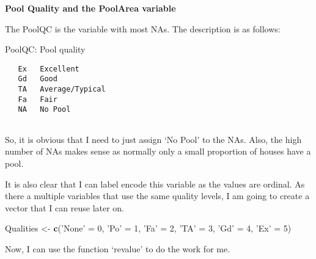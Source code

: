 \documentclass[]{article}
\newenvironment{Shaded}{\begin{snugshade}}{\end{snugshade}}
\newcommand{\KeywordTok}[1]{\textcolor[rgb]{0.13,0.29,0.53}{\textbf{#1}}}
\newcommand{\DecValTok}[1]{\textcolor[rgb]{0.00,0.00,0.81}{#1}}
\newcommand{\StringTok}[1]{\textcolor[rgb]{0.31,0.60,0.02}{#1}}
\newcommand{\OperatorTok}[1]{\textcolor[rgb]{0.81,0.36,0.00}{\textbf{#1}}}
\newcommand{\NormalTok}[1]{#1}
\begin{document}
\textbf{Pool Quality and the PoolArea variable}

The PoolQC is the variable with most NAs. The description is as follows:

PoolQC: Pool quality

\begin{verbatim}
   Ex   Excellent
   Gd   Good
   TA   Average/Typical
   Fa   Fair
   NA   No Pool
   
\end{verbatim}

So, it is obvious that I need to just assign `No Pool' to the NAs. Also,
the high number of NAs makes sense as normally only a small proportion
of houses have a pool.

\begin{Shaded}
\end{Shaded}

It is also clear that I can label encode this variable as the values are
ordinal. As there a multiple variables that use the same quality levels,
I am going to create a vector that I can reuse later on.

\begin{Shaded}
\begin{Highlighting}[]
\NormalTok{Qualities <-}\StringTok{ }\KeywordTok{c}\NormalTok{(}\StringTok{'None'}\NormalTok{ =}\StringTok{ }\DecValTok{0}\NormalTok{, }\StringTok{'Po'}\NormalTok{ =}\StringTok{ }\DecValTok{1}\NormalTok{, }\StringTok{'Fa'}\NormalTok{ =}\StringTok{ }\DecValTok{2}\NormalTok{, }\StringTok{'TA'}\NormalTok{ =}\StringTok{ }\DecValTok{3}\NormalTok{, }\StringTok{'Gd'}\NormalTok{ =}\StringTok{ }\DecValTok{4}\NormalTok{, }\StringTok{'Ex'}\NormalTok{ =}\StringTok{ }\DecValTok{5}\NormalTok{)}
\end{Highlighting}
\end{Shaded}

Now, I can use the function `revalue' to do the work for me.

\begin{Shaded}
\end{Shaded}
\end{document}
